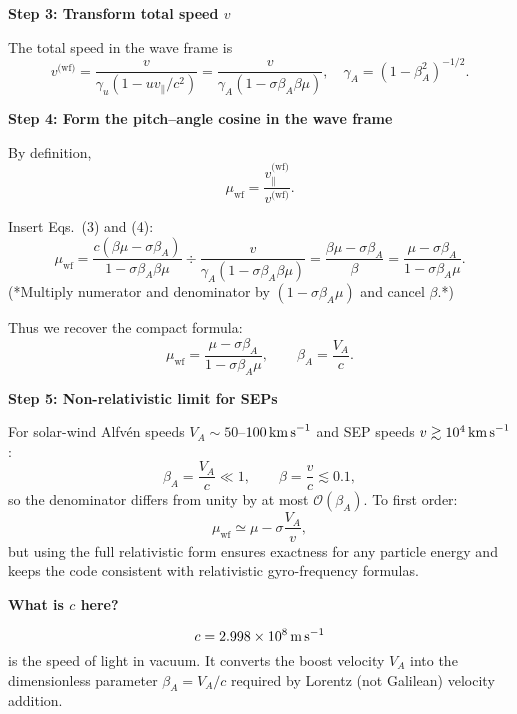 \begin{tcolorbox}[colback=white, colframe=black, title={Detailed Derivation of the Pitch–Angle Cosine in the \textbf{Wave Frame}}]
\medskip

\textbf{Step 3: Transform total speed $v$}

The total speed in the wave frame is
\begin{equation}
v^{\text{(wf)}} = \frac{v}{\gamma_u (1 - uv_\parallel / c^2)} = \frac{v}{\gamma_A (1 - \sigma \beta_A \beta \mu)},
\quad
\gamma_A = (1 - \beta_A^2)^{-1/2}.
\tag{4}
\end{equation}

\medskip

\end{tcolorbox}
\begin{tcolorbox}[colback=white, colframe=black, title={Detailed Derivation of the Pitch–Angle Cosine in the \textbf{Wave Frame}}]

\textbf{Step 4: Form the pitch–angle cosine in the wave frame}

By definition,
\begin{equation}
\mu_{\text{wf}} = \frac{v_\parallel^{\text{(wf)}}}{v^{\text{(wf)}}}.
\tag{5}
\end{equation}

Insert Eqs.~(3) and (4):
\[
\mu_{\text{wf}} = \frac{c(\beta \mu - \sigma \beta_A)}{1 - \sigma \beta_A \beta \mu}
\div
\frac{v}{\gamma_A (1 - \sigma \beta_A \beta \mu)}
= \frac{\beta \mu - \sigma \beta_A}{\beta}
= \frac{\mu - \sigma \beta_A}{1 - \sigma \beta_A \mu}.
\tag{6}
\]
(*Multiply numerator and denominator by $(1 - \sigma \beta_A \mu)$ and cancel $\beta$.*)

Thus we recover the compact formula:
\[
\boxed{
\mu_{\text{wf}} = \frac{\mu - \sigma \beta_A}{1 - \sigma \beta_A \mu}
},
\qquad
\beta_A = \frac{V_A}{c}.
\]

\medskip

\textbf{Step 5: Non-relativistic limit for SEPs}

For solar-wind Alfvén speeds $V_A \sim 50$--$100\,\text{km\,s}^{-1}$ and SEP speeds $v \gtrsim 10^4\,\text{km\,s}^{-1}$:
\[
\beta_A = \frac{V_A}{c} \ll 1, \qquad
\beta = \frac{v}{c} \lesssim 0.1,
\]
so the denominator differs from unity by at most $\mathcal{O}(\beta_A)$. To first order:
\[
\mu_{\text{wf}} \simeq \mu - \sigma \frac{V_A}{v},
\]
but using the full relativistic form ensures exactness for any particle energy and keeps the code consistent with relativistic gyro-frequency formulas.

\medskip

\textbf{What is $c$ here?}

\[
c = 2.998 \times 10^8\,\text{m\,s}^{-1}
\]
is the speed of light in vacuum. It converts the boost velocity $V_A$ into the dimensionless parameter $\beta_A = V_A/c$ required by Lorentz (not Galilean) velocity addition.

\end{tcolorbox}

